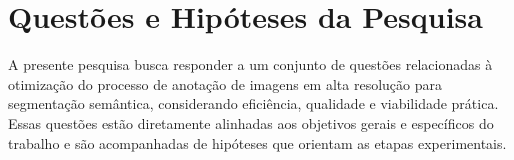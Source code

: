 



\section{Questões e Hipóteses da Pesquisa}

A presente pesquisa busca responder a um conjunto de questões relacionadas à otimização do processo de anotação de imagens em alta resolução para segmentação semântica, considerando eficiência, qualidade e viabilidade prática. Essas questões estão diretamente alinhadas aos objetivos gerais e específicos do trabalho e são acompanhadas de hipóteses que orientam as etapas experimentais.

